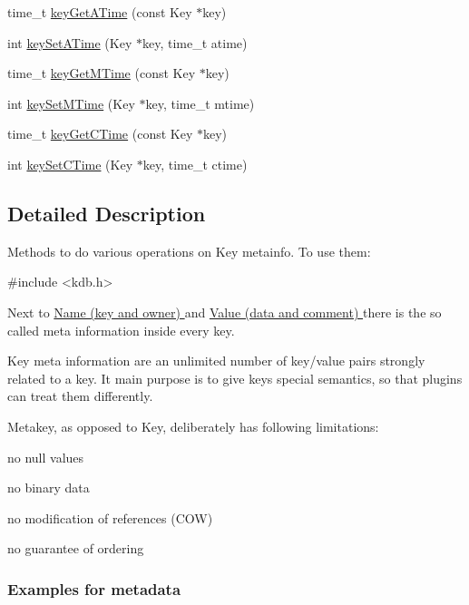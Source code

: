 \begin{DoxyCompactItemize}
\item 
time\-\_\-t \hyperlink{group__keymeta_ga6b05da399c3c78904969ef39f191b0eb}{key\-Get\-A\-Time} (const Key $\ast$key)
\item 
int \hyperlink{group__keymeta_ga995d8b84731673c88c7c01f3fed538b9}{key\-Set\-A\-Time} (Key $\ast$key, time\-\_\-t atime)
\item 
time\-\_\-t \hyperlink{group__keymeta_ga57689eb5691679071463b777ae786ae9}{key\-Get\-M\-Time} (const Key $\ast$key)
\item 
int \hyperlink{group__keymeta_ga481d8997187992fe4bbf288bc8ef4db7}{key\-Set\-M\-Time} (Key $\ast$key, time\-\_\-t mtime)
\item 
time\-\_\-t \hyperlink{group__keymeta_ga2c213c120cbe02201278ef7fb8cd94be}{key\-Get\-C\-Time} (const Key $\ast$key)
\item 
int \hyperlink{group__keymeta_ga9f502ecab8ab43f0b17220fcc95f3fa5}{key\-Set\-C\-Time} (Key $\ast$key, time\-\_\-t ctime)
\end{DoxyCompactItemize}


\subsection{Detailed Description}
Methods to do various operations on Key metainfo. To use them\-: 
\begin{DoxyCode}
\textcolor{preprocessor}{#include <kdb.h>}
\end{DoxyCode}


Next to \hyperlink{group__keyname}{Name (key and owner) } and \hyperlink{group__keyvalue}{Value (data and comment) } there is the so called meta information inside every key.

Key meta information are an unlimited number of key/value pairs strongly related to a key. It main purpose is to give keys special semantics, so that plugins can treat them differently.

Metakey, as opposed to Key, deliberately has following limitations\-:
\begin{DoxyItemize}
\item no null values
\item no binary data
\item no modification of references (C\-O\-W)
\item no guarantee of ordering
\end{DoxyItemize}

\subsubsection*{Examples for metadata}

